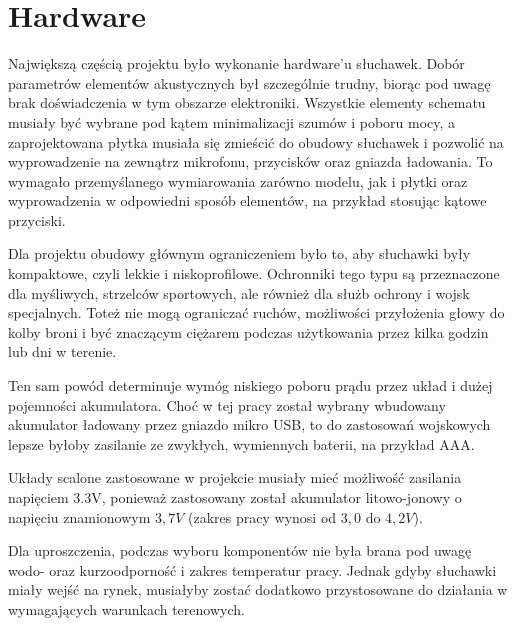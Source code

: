 \chapter{Hardware}
\label{cha:hardware}

Największą częścią projektu było wykonanie hardware'u słuchawek. Dobór parametrów elementów akustycznych był szczególnie trudny, biorąc pod uwagę brak doświadczenia w tym obszarze elektroniki. Wszystkie elementy schematu musiały być wybrane pod kątem minimalizacji szumów i poboru mocy, a zaprojektowana płytka musiała się zmieścić do obudowy słuchawek i pozwolić na wyprowadzenie na zewnątrz mikrofonu, przycisków oraz gniazda ładowania. To wymagało przemyślanego wymiarowania zarówno modelu, jak i płytki oraz wyprowadzenia w odpowiedni sposób elementów, na przykład stosując kątowe przyciski.

Dla projektu obudowy głównym ograniczeniem było to, aby słuchawki były kompaktowe, czyli lekkie i niskoprofilowe. Ochronniki tego typu są przeznaczone dla myśliwych, strzelców sportowych, ale również dla służb ochrony i wojsk specjalnych. Toteż nie mogą ograniczać ruchów, możliwości przyłożenia głowy do kolby broni i być znaczącym ciężarem podczas użytkowania przez kilka godzin lub dni w terenie.

Ten sam powód determinuje wymóg niskiego poboru prądu przez układ i dużej pojemności akumulatora. Choć w tej pracy został wybrany wbudowany akumulator ładowany przez gniazdo mikro USB, to do zastosowań wojskowych lepsze byłoby zasilanie ze zwykłych, wymiennych baterii, na przykład AAA.

Układy scalone zastosowane w projekcie musiały mieć możliwość zasilania napięciem 3.3V, ponieważ zastosowany został akumulator litowo-jonowy o napięciu znamionowym $3,7V$ (zakres pracy wynosi od $3,0$ do $4,2V$).

Dla uproszczenia, podczas wyboru komponentów nie była brana pod uwagę wodo- oraz kurzoodporność i zakres temperatur pracy. Jednak gdyby słuchawki miały wejść na rynek, musiałyby zostać dodatkowo przystosowane do działania w wymagających warunkach terenowych.